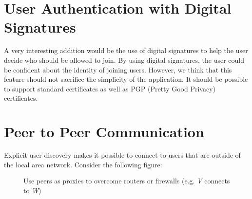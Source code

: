 \section{User Authentication with Digital Signatures}
A very interesting addition would be the use of digital signatures to help
the user decide who should be allowed to join. By using digital
signatures, the user could be confident about the identity of joining users.
However, we think that this feature should not sacrifice the simplicity
of the application. It should be possible to support standard certificates
as well as PGP (Pretty Good Privacy) certificates.


\section{Peer to Peer Communication}
Explicit user discovery makes it possible to connect to users that are outside 
of the local area network. Consider the following figure:

\begin{figure}[H]
 \centering
 \caption{Use peers as proxies to overcome routers or firewalls (e.g. \emph{V} connects to \emph{W})}
 \label{fig:network.protocol.requestcommunication}
\end{figure}

